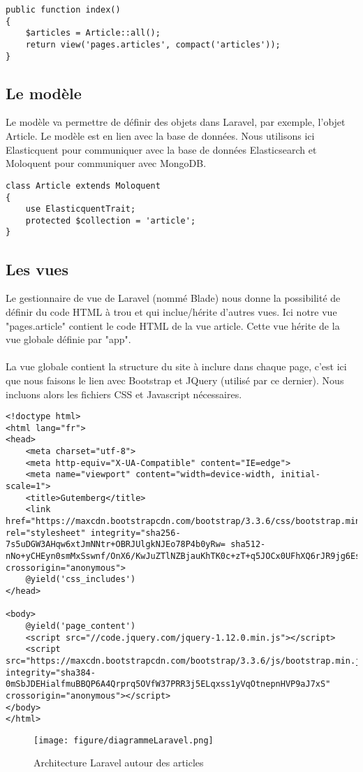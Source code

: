\begin{verbatim}
public function index()
{
	$articles = Article::all();
	return view('pages.articles', compact('articles'));
}
\end{verbatim}

\subsection{Le modèle}
Le modèle va permettre de définir des objets dans Laravel, par exemple, l'objet Article. Le modèle est en lien avec la base de données. Nous utilisons ici Elasticquent\cite{GitElasticquent} pour communiquer avec la base de données Elasticsearch et Moloquent\cite{GitLaravelMongo} pour communiquer avec MongoDB.

\begin{verbatim}
class Article extends Moloquent
{
	use ElasticquentTrait;
	protected $collection = 'article';
}
\end{verbatim}

\subsection{Les vues}

Le gestionnaire de vue de Laravel (nommé Blade) nous donne la possibilité de définir du code HTML à trou et qui inclue/hérite d'autres vues. Ici notre vue "pages.article" contient le code HTML de la vue article. Cette vue hérite de la vue globale définie par "app".
\paragraph{}
La vue globale contient la structure du site à inclure dans chaque page, c'est ici que nous faisons le lien avec Bootstrap et JQuery (utilisé par ce dernier). Nous incluons alors les fichiers CSS et Javascript nécessaires.

\begin{lstlisting}
<!doctype html>
<html lang="fr">
<head>
	<meta charset="utf-8">
	<meta http-equiv="X-UA-Compatible" content="IE=edge">
	<meta name="viewport" content="width=device-width, initial-scale=1">
	<title>Gutemberg</title>
	<link href="https://maxcdn.bootstrapcdn.com/bootstrap/3.3.6/css/bootstrap.min.css" rel="stylesheet" integrity="sha256-7s5uDGW3AHqw6xtJmNNtr+OBRJUlgkNJEo78P4b0yRw= sha512-nNo+yCHEyn0smMxSswnf/OnX6/KwJuZTlNZBjauKhTK0c+zT+q5JOCx0UFhXQ6rJR9jg6Es8gPuD2uZcYDLqSw==" crossorigin="anonymous">
	@yield('css_includes')
</head>

<body>
	@yield('page_content')
	<script src="//code.jquery.com/jquery-1.12.0.min.js"></script>
	<script src="https://maxcdn.bootstrapcdn.com/bootstrap/3.3.6/js/bootstrap.min.js" integrity="sha384-0mSbJDEHialfmuBBQP6A4Qrprq5OVfW37PRR3j5ELqxss1yVqOtnepnHVP9aJ7xS" crossorigin="anonymous"></script>
</body>
</html>
\end{lstlisting}

\begin{figure}[H]
        \centering
        \texttt{[image: figure/diagrammeLaravel.png]}
            \caption{Architecture Laravel autour des articles}
            \label{fig:datajsonPhp}
\end{figure}